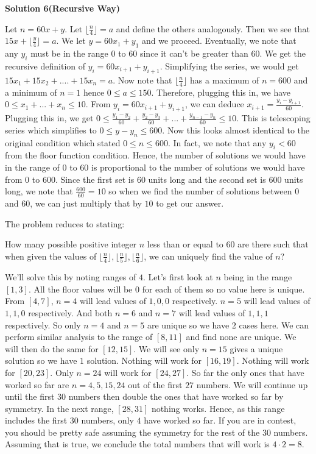 \begin{enumerate}
\textbf{Solution 6(Recursive Way)}

Let $n = 60x + y$. Let $\lfloor \frac{n}{4} \rfloor = a$ and define the others analogously. Then we see that $15x + \lfloor \frac{y}{4} \rfloor = a$. We let $y = 60x_1 + y_1$ and we proceed. Eventually, we note that any $y_i$ must be in the range $0$ to $60$ since it can't be greater than $60$. We get the recursive definition of $y_i = 60x_{i + 1} + y_{i + 1}$. Simplifying the series, we would get $15x_1 + 15x_2 + .... + 15x_n = a$. Now note that $\lfloor \frac{n}{4} \rfloor$ has a maximum of $n = 600$ and a minimum of $n = 1$ hence $0 \leq a \leq 150$. Therefore, plugging this in, we have $0 \leq x_1 + ... + x_n \leq 10$. From $y_i = 60x_{i + 1} + y_{i + 1}$, we can deduce $x_{i + 1} = \frac{y_i - y_{i + 1}}{60}$. Plugging this in, we get $0 \leq \frac{y_1 - y_2}{60} + \frac{y_2 - y_3}{60} + ... + \frac{y_{n - 1} - y_n}{60} \leq 10$. This is telescoping series which simplifies to $0 \leq y - y_n \leq 600$. Now this looks almost identical to the original condition which stated $0 \leq n \leq 600$. In fact, we note that any $y_i < 60$ from the floor function condition. Hence, the number of solutions we would have in the range of $0$ to $60$ is proportional to the number of solutions we would have from $0$ to $600$. Since the first set is $60$ units long and the second set is $600$ units long, we note that $\frac{600}{60} = 10$ so when we find the number of solutions between $0$ and $60$, we can just multiply that by $10$ to get our answer.

 The problem reduces to stating:

 How many possible positive integer $n$ less than or equal to $60$ are there such that when given the values of $\lfloor \frac{n}{4} \rfloor, \lfloor \frac{n}{5} \rfloor, \lfloor \frac{n}{6} \rfloor$, we can uniquely find the value of $n$?

 We'll solve this by noting ranges of $4$. Let's first look at $n$ being in the range $[1, 3]$. All the floor values will be $0$ for each of them so no value here is unique. From $[4, 7]$, $n = 4$ will lead values of $1, 0, 0$ respectively. $n = 5$ will lead values of $1, 1, 0$ respectively. And both $n = 6$ and $n = 7$ will lead values of $1, 1, 1$ respectively. So only $n = 4$ and $n = 5$ are unique so we have $2$ cases here. We can perform similar analysis to the range of $[8, 11]$ and find none are unique. We will then do the same for $[12, 15]$. We will see only $n = 15$ gives a unique solution so we have $1$ solution. Nothing will work for $[16, 19]$. Nothing will work for $[20, 23]$. Only $n = 24$ will work for $[24, 27]$. So far the only ones that have worked so far are $n = 4, 5, 15, 24$ out of the first $27$ numbers. We will continue up until the first $30$ numbers then double the ones that have worked so far by symmetry. In the next range, $[28, 31]$ nothing works. Hence, as this range includes the first $30$ numbers, only $4$ have worked so far. If you are in contest, you should be pretty safe assuming the symmetry for the rest of the $30$ numbers. Assuming that is true, we conclude the total numbers that will work is $4 \cdot 2 = 8$. 


\end{enumerate}
